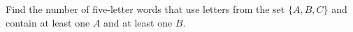 Find the number of five-letter words that use letters from the set $\{A,B,C\}$ and contain at least one $A$ and at least one $B$.
